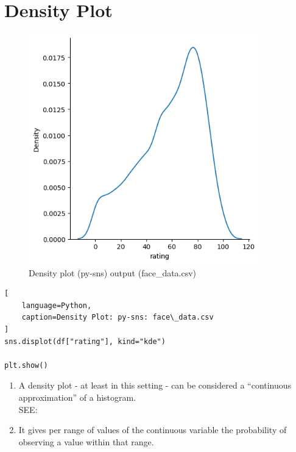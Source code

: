 \section{Density Plot \cite{data/online/seaborn.displot}} \label{Visualizing Data/Density Plot}

\begin{table}[H]
\begin{minipage}[t]{0.35\linewidth}
\begin{figure}[H]
    \centering
    \includegraphics[width=0.9\linewidth, height=10cm, keepaspectratio]{images/data/__visualizations__/sns-density-kde-rating-face-data.png}
    \caption{Density plot (py-sns) output (face\_data.csv)}
\end{figure}
\end{minipage}
\hspace{0.2cm}
\vrule width 1pt
\hspace{0.5cm}
\begin{minipage}[t]{0.57\linewidth}
\begin{lstlisting}[
    language=Python,
    caption=Density Plot: py-sns: face\_data.csv
]
sns.displot(df["rating"], kind="kde")

plt.show()
\end{lstlisting}

\vspace{0.2cm}

\begin{enumerate}
    \item A density plot - at least in this setting - can be considered a “continuous approximation” of a histogram. \hfill \cite{statistics/book/Statistics-for-Data-Scientists/Maurits-Kaptein} \\
    SEE: 
    
    \item It gives per range of values of the continuous variable the probability of observing a value within that range. \hfill \cite{statistics/book/Statistics-for-Data-Scientists/Maurits-Kaptein}

    
\end{enumerate}

\end{minipage}
\end{table}





